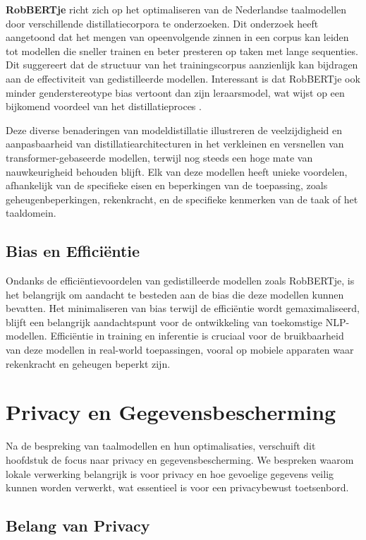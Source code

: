 \textbf{RobBERTje} richt zich op het optimaliseren van de Nederlandse taalmodellen door verschillende distillatiecorpora te onderzoeken. Dit onderzoek heeft aangetoond dat het mengen van opeenvolgende zinnen in een corpus kan leiden tot modellen die sneller trainen en beter presteren op taken met lange sequenties. Dit suggereert dat de structuur van het trainingscorpus aanzienlijk kan bijdragen aan de effectiviteit van gedistilleerde modellen. Interessant is dat RobBERTje ook minder genderstereotype bias vertoont dan zijn leraarsmodel, wat wijst op een bijkomend voordeel van het distillatieproces \autocite{Delobelle2021}.

Deze diverse benaderingen van modeldistillatie illustreren de veelzijdigheid en aanpasbaarheid van distillatiearchitecturen in het verkleinen en versnellen van trans\-for\-mer-gebaseerde modellen, terwijl nog steeds een hoge mate van nauwkeurigheid behouden blijft. Elk van deze modellen heeft unieke voordelen, afhankelijk van de specifieke eisen en beperkingen van de toepassing, zoals geheugenbeperkingen, rekenkracht, en de specifieke kenmerken van de taak of het taaldomein.


\subsection{Bias en Efficiëntie}

Ondanks de efficiëntievoordelen van gedistilleerde modellen zoals RobBERTje, is het belangrijk om aandacht te besteden aan de bias die deze modellen kunnen bevatten. Het minimaliseren van bias terwijl de efficiëntie wordt gemaximaliseerd, blijft een belangrijk aandachtspunt voor de ontwikkeling van toekomstige NLP-modellen. Efficiëntie in training en inferentie is cruciaal voor de bruikbaarheid van deze modellen in real-world toepassingen, vooral op mobiele apparaten waar rekenkracht en geheugen beperkt zijn.


\section{Privacy en Gegevensbescherming}

Na de bespreking van taalmodellen en hun optimalisaties, verschuift dit hoofdstuk de focus naar privacy en gegevensbescherming. We bespreken waarom lokale verwerking belangrijk is voor privacy en hoe gevoelige gegevens veilig kunnen worden verwerkt, wat essentieel is voor een privacybewust toetsenbord.

\subsection{Belang van Privacy}

